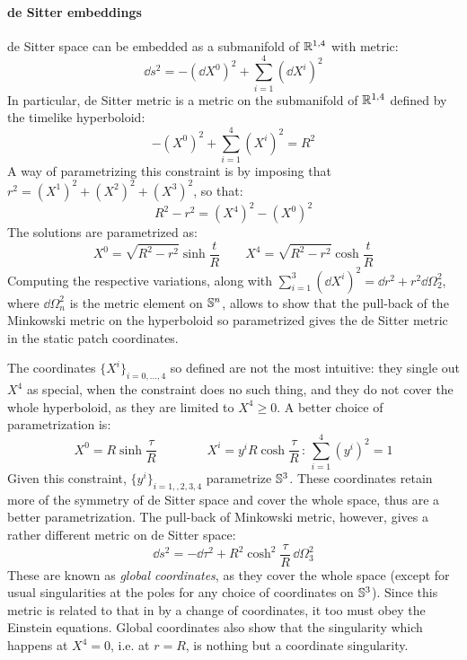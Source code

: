 \paragraph{de Sitter embeddings}

de Sitter space can be embedded as a submanifold of $ \mathbb{R}^{1,4} $ with metric:
\begin{equation}
  \dd s^2 = - (\dd X^0)^2 + \sum_{i = 1}^{4} (\dd X^i)^2
  \label{eq:dS-param-metric}
\end{equation}
In particular, de Sitter metric  is a metric on the submanifold of $ \mathbb{R}^{1,4} $ defined by the timelike hyperboloid:
\begin{equation}
  -(X^0)^2 + \sum_{i = 1}^{4} (X^i)^2 = R^2
  \label{eq:dS-param}
\end{equation}
A way of parametrizing this constraint is by imposing that $ r^2 = (X^1)^2 + (X^2)^2 + (X^3)^2 $, so that:
\begin{equation*}
  R^2 - r^2 = (X^4)^2 - (X^0)^2
\end{equation*}
The solutions are parametrized as:
\begin{equation*}
  X^0 = \sqrt{R^2 - r^2} \sinh \frac{t}{R}
  \qquad
  X^4 = \sqrt{R^2 - r^2} \cosh \frac{t}{R}
\end{equation*}
Computing the respective variations, along with $ \sum_{i = 1}^{3} (\dd X^i)^2 = \dd r^2 + r^2 \dd \Omega_2^2 $, where $ \dd \Omega_n^2 $ is the metric element on $ \mathbb{S}^{n} $, allows to show that the pull-back of the Minkowski metric  on the hyperboloid  so parametrized gives the de Sitter metric  in the static patch coordinates.

The coordinates $ \{X^i\}_{i = 0,\dots,4} $ so defined are not the most intuitive: they single out $ X^4 $ as special, when the constraint does no such thing, and they do not cover the whole hyperboloid, as they are limited to $ X^4 \ge 0 $. A better choice of parametrization is:
\begin{equation*}
  X^0 = R \sinh \frac{\tau}{R}
  \qquad \qquad
  X^i = y^i R \cosh \frac{\tau}{R}
  \,:\,
  \sum_{i = 1}^{4} (y^i)^2 = 1
\end{equation*}
Given this constraint, $ \{y^i\}_{i = 1,,2,3,4} $ parametrize $ \mathbb{S}^{3} $. These coordinates retain more of the symmetry of de Sitter space and cover the whole space, thus are a better parametrization. The pull-back of Minkowski metric, however, gives a rather different metric on de Sitter space:
\begin{equation}
  \dd s^2 = - \dd \tau^2 + R^2 \cosh^2 \frac{\tau}{R}\, \dd \Omega_3^2
  \label{eq:ds-global-coo}
\end{equation}
These are known as \textit{global coordinates}, as they cover the whole space (except for usual singularities at the poles for any choice of coordinates on $ \mathbb{S}^{3} $). Since this metric is related to that in  by a change of coordinates, it too must obey the Einstein equations. Global coordinates also show that the singularity which happens at $ X^4 = 0 $, i.e. at $ r = R $, is nothing but a coordinate singularity.

